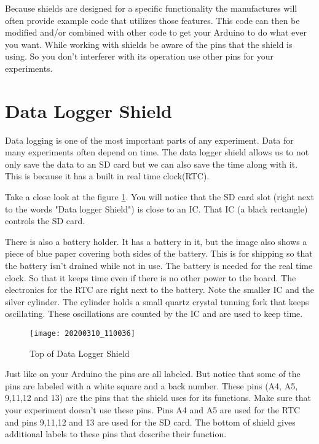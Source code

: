 	Because shields are designed for a specific functionality the manufactures will often provide example code that utilizes those features. This code can then be modified and/or combined with other code to get your Arduino to do what ever you want. While working with shields be aware of the pins that the shield is using. So you don't interferer with its operation use other pins for your experiments.

\section{Data Logger Shield}
	Data logging is one of the most important parts of any experiment. Data for many experiments often depend on time. The data logger shield allows us to not only save the data to an SD card but we can also save the time along with it. This is because it has a built in real time clock(RTC). 
	
	Take a close look at the figure \ref{Data_Logger}. You will notice that the SD card slot (right next to the words "Data logger Shield") is close to an IC. That IC (a black rectangle) controls the SD card. 
	
	There is also a battery holder. It has a battery in it, but the image also shows a piece of blue paper covering both sides of the battery. This is for shipping so that the battery isn't drained while not in use. The battery is needed for the real time clock. So that it keeps time even if there is no other power to the board. The electronics for the RTC are right next to the battery. Note the smaller IC and the silver cylinder. The cylinder holds a small quartz crystal tunning fork that keeps oscillating. These oscillations are counted by the IC and are used to keep time. 
	\begin{figure}[h!] 
		\caption{Top of Data Logger Shield}
		\label{Data_Logger}
		\texttt{[image: 20200310\_110036]}
	\end{figure}
	
	Just like on your Arduino the pins are all labeled. But notice that some of the pins are labeled with a white square and a back number. These pins (A4, A5, 9,11,12 and 13) are the pins that the shield uses for its functions. Make sure that your experiment doesn't use these pins. Pins A4 and A5 are used for the RTC and pins 9,11,12 and 13 are used for the SD card. The bottom of shield gives additional labels to these pins that describe their function. 



